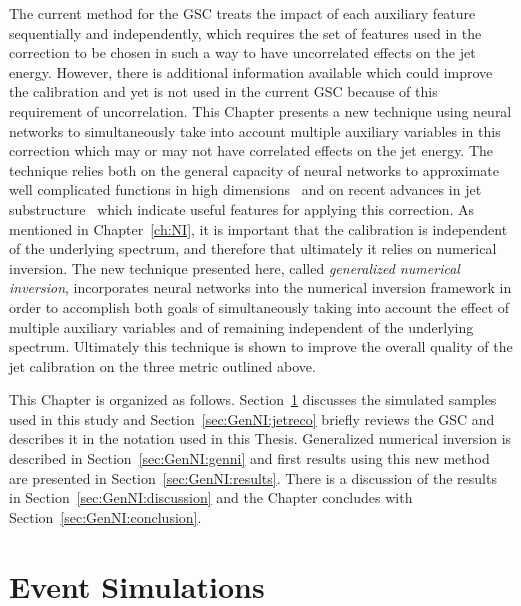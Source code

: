 The current method for the GSC treats the impact of each auxiliary feature sequentially and independently, which requires the set of features used in the correction to be chosen in such a way to have uncorrelated effects on the jet energy.
However, there is additional information available which could improve the calibration and yet is not used in the current GSC because of this requirement of uncorrelation.
This Chapter presents a new technique using neural networks to simultaneously take into account multiple auxiliary variables in this correction which may or may not have correlated effects on the jet energy.
The technique relies both on the general capacity of neural networks to approximate well complicated functions in high dimensions~\cite{HORNIK1991251} and on recent advances in jet substructure~\cite{Larkoski:2017jix} which indicate useful features for applying this correction.
As mentioned in Chapter~\ref{ch:NI}, it is important that the calibration is independent of the underlying spectrum, and therefore that ultimately it relies on numerical inversion.
The new technique presented here, called \textit{generalized numerical inversion}, incorporates neural networks into the numerical inversion framework in order to accomplish both goals of simultaneously taking into account the effect of multiple auxiliary variables and of remaining independent of the underlying spectrum.
Ultimately this technique is shown to improve the overall quality of the jet calibration on the three metric outlined above.

This Chapter is organized as follows.
Section~\ref{sec:GenNI:atlas} discusses the simulated samples used in this study and Section~\ref{sec:GenNI:jetreco} briefly reviews the GSC and describes it in the notation used in this Thesis.
Generalized numerical inversion is described in Section~\ref{sec:GenNI:genni} and first results using this new method are presented in Section~\ref{sec:GenNI:results}.
There is a discussion of the results in Section~\ref{sec:GenNI:discussion} and the Chapter concludes with Section~\ref{sec:GenNI:conclusion}.

\section{Event Simulations}
\label{sec:GenNI:atlas}


